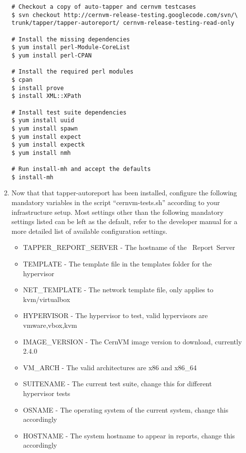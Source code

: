 \begin{enumerate}
\begin{lstlisting}
# Checkout a copy of auto-tapper and cernvm testcases
$ svn checkout http://cernvm-release-testing.googlecode.com/svn/\
trunk/tapper/tapper-autoreport/ cernvm-release-testing-read-only

# Install the missing dependencies
$ yum install perl-Module-CoreList
$ yum install perl-CPAN

# Install the required perl modules
$ cpan
$ install prove
$ install XML::XPath

# Install test suite dependencies
$ yum install uuid
$ yum install spawn
$ yum install expect
$ yum install expectk
$ yum install nmh

# Run install-mh and accept the defaults
$ install-mh
\end{lstlisting}

\item	Now that that tapper-autoreport has been installed, configure the following mandatory variables in the script
		``cernvm-tests.sh'' according to your \tapper infrastructure setup. Most settings other than the following
		mandatory settings listed can be left as the default, refer to the developer manual for a more detailed list of 
		available configuration settings.
\begin{itemize}
\item	TAPPER\_REPORT\_SERVER	- The hostname of the \tapper~Report~Server
\item	TEMPLATE				- The template file in the templates folder for the hypervisor
\item	NET\_TEMPLATE			- The network template file, only applies to kvm/virtualbox
\item	HYPERVISOR				- The hypervisor to test, valid hypervisors are vmware,vbox,kvm
\item	IMAGE\_VERSION			- The CernVM image version to download, currently 2.4.0
\item	VM\_ARCH					- The valid architectures are x86 and x86\_64
\item	SUITENAME				- The current test suite, change this for different hypervisor tests
\item	OSNAME					- The operating system of the current system, change this accordingly
\item	HOSTNAME				- The system hostname to appear in reports, change this accordingly
\end{itemize}	


\end{enumerate}

